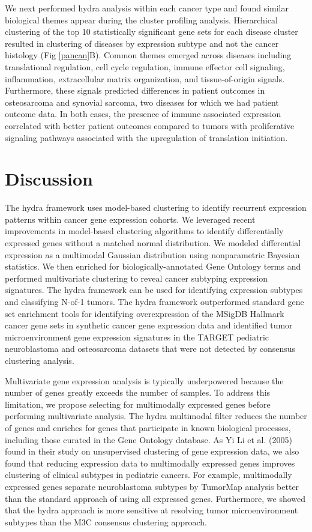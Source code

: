 \documentclass[10pt,letterpaper]{article}
\begin{document}
We next performed hydra analysis within each cancer type and found similar biological themes appear during the cluster profiling analysis. Hierarchical clustering of the top 10 statistically significant gene sets for each disease cluster resulted in clustering of diseases by expression subtype and not the cancer histology (Fig \ref{pancan}B). Common themes emerged across diseases including translational regulation, cell cycle regulation, immune effector cell signaling, inflammation, extracellular matrix organization, and tissue-of-origin signals. Furthermore, these signals predicted differences in patient outcomes in osteosarcoma and synovial sarcoma, two diseases for which we had patient outcome data. In both cases, the presence of immune associated expression correlated with better patient outcomes compared to tumors with proliferative signaling pathways associated with the upregulation of translation initiation.


\section*{Discussion}
The hydra framework uses model-based clustering to identify recurrent expression patterns within cancer gene expression cohorts. We leveraged recent improvements in model-based clustering algorithms to identify differentially expressed genes without a matched normal distribution. We modeled differential expression as a multimodal Gaussian distribution using nonparametric Bayesian statistics. We then enriched for biologically-annotated Gene Ontology terms and performed multivariate clustering to reveal cancer subtyping expression signatures. The hydra framework can be used for identifying expression subtypes and classifying N-of-1 tumors. The hydra framework outperformed standard gene set enrichment tools for identifying overexpression of the MSigDB Hallmark cancer gene sets in synthetic cancer gene expression data and identified tumor microenvironment gene expression signatures in the TARGET pediatric neuroblastoma and osteosarcoma datasets that were not detected by consensus clustering analysis. 

Multivariate gene expression analysis is typically underpowered because the number of genes greatly exceeds the number of samples. To address this limitation, we propose selecting for multimodally expressed genes before performing multivariate analysis. The hydra multimodal filter reduces the number of genes and enriches for genes that participate in known biological processes, including those curated in the Gene Ontology database. As Yi Li et al. (2005) found in their study on unsupervised clustering of gene expression data, we also found that reducing expression data to multimodally expressed genes improves clustering of clinical subtypes in pediatric cancers. For example, multimodally expressed genes separate neuroblastoma subtypes by TumorMap analysis better than the standard approach of using all expressed genes. Furthermore, we showed that the hydra approach is more sensitive at resolving tumor microenvironment subtypes than the M3C consensus clustering approach.
\end{document}
